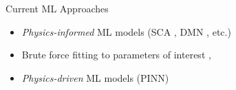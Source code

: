 \begin{frame}{Current ML Approaches}
\centering
\begin{minipage}{0.8\textwidth}
    \begin{itemize}
      \item \textit{Physics-informed} ML models (SCA \cite{Liu2016b}, DMN \cite{Liu2019a}, etc.)
      \item Brute force fitting to parameters of interest \cite{Rocha2020},\cite{Bessa2017b}
      \item \textit{Physics-driven} ML models (PINN\cite{Raissi2017})
    \end{itemize}
\end{minipage}%
\end{frame}

